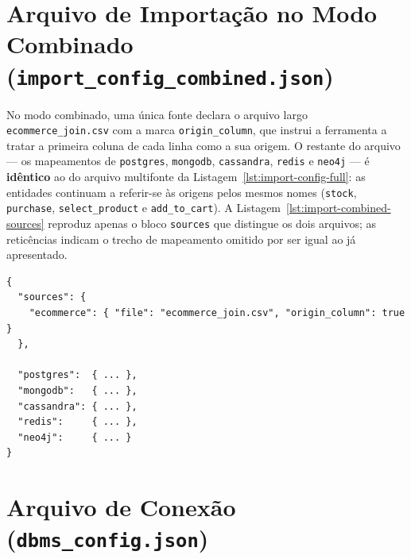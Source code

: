\section{Arquivo de Importação no Modo Combinado (\texttt{import\_\allowbreak config\_\allowbreak combined.json})}

No modo combinado, uma única fonte declara o arquivo largo \texttt{ecommerce\_\allowbreak join.csv} com
a marca \texttt{origin\_column}, que instrui a ferramenta a tratar a primeira coluna de cada
linha como a sua origem. O restante do arquivo --- os mapeamentos de \texttt{postgres},
\texttt{mongodb}, \texttt{cassandra}, \texttt{redis} e \texttt{neo4j} --- é
\textbf{idêntico} ao do arquivo multifonte da Listagem~\ref{lst:import-config-full}: as
entidades continuam a referir-se às origens pelos mesmos nomes (\texttt{stock},
\texttt{purchase}, \texttt{select\_product} e \texttt{add\_to\_cart}). A
Listagem~\ref{lst:import-combined-sources} reproduz apenas o bloco \texttt{sources} que
distingue os dois arquivos; as reticências indicam o trecho de mapeamento omitido por ser
igual ao já apresentado.

\begin{lstlisting}[style=jsonstyle,caption={Bloco \texttt{sources} do arquivo de importação no modo combinado (\texttt{import\_config\_combined.json}).},label={lst:import-combined-sources}]
{
  "sources": {
    "ecommerce": { "file": "ecommerce_join.csv", "origin_column": true }
  },

  "postgres":  { ... },
  "mongodb":   { ... },
  "cassandra": { ... },
  "redis":     { ... },
  "neo4j":     { ... }
}
\end{lstlisting}

\section{Arquivo de Conexão (\texttt{dbms\_config.json})}

